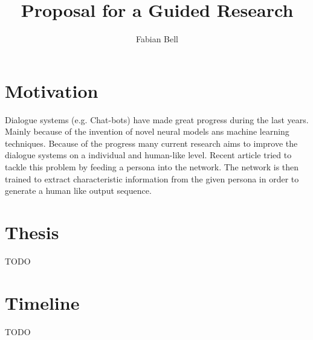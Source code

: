 \documentclass[11pt]{article}
\title{Proposal for a Guided Research}
\author{Fabian Bell}
\date
\begin{document}
\maketitle
\section{Motivation}
Dialogue systems (e.g. Chat-bots) have made great progress during the last years. Mainly because of the invention of novel neural models ans machine learning techniques. Because of the progress many current research aims to improve the dialogue systems on a individual and human-like level. Recent article \cite[]{DBLP:journals/corr/abs-1901-08149, liu2020impress} tried to tackle this problem by feeding a persona into the network. The network is then trained to extract characteristic information from the given persona in order to generate a human like output sequence. 
\section{Thesis}
TODO
\section{Timeline}
TODO



\end{document}
